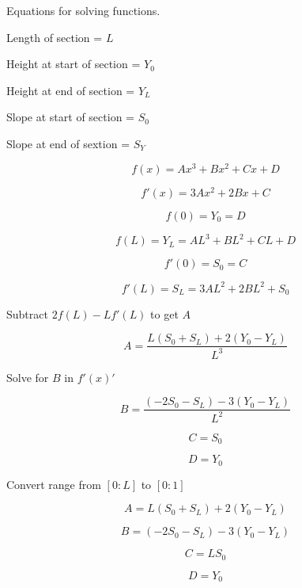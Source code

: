 \documentclass{article}
\begin{document}
Equations for solving functions.\\
\bigbreak

Length of section = $L$

Height at start of section = $Y_0$

Height at end of section = $Y_L$

Slope at start of section = $S_0$

Slope at end of sextion = $S_Y$


\begin{equation}
  f(x) = Ax^3 + Bx^2 + Cx + D
\end{equation}

\begin{equation}
  f'(x) = 3Ax^2 + 2Bx + C
\end{equation}

\begin{equation}
  f(0) = Y_0 = D
\end{equation}

\begin{equation}
  f(L) = Y_L = AL^3 + BL^2 + CL + D
\end{equation}

\begin{equation}
  f'(0) = S_0 = C
\end{equation}

\begin{equation}
  f'(L) = S_L = 3AL^2 + 2BL^2 + S_0
\end{equation}

\bigbreak
\bigbreak
Subtract $2f(L) - Lf'(L)$ to get $A$
\bigbreak
\bigbreak

\begin{equation}
  A = \frac{L(S_0 + S_L) + 2(Y_0 - Y_L)}{L^3}
\end{equation}

\bigbreak
\bigbreak
Solve for $B$ in $f'(x)'$
\bigbreak
\bigbreak

\begin{equation}
  B = \frac{(-2S_0 - S_L) - 3(Y_0 - Y_L)}{L^2}
\end{equation}

\begin{equation}
  C = S_0
\end{equation}

\begin{equation}
  D = Y_0
\end{equation}

\pagebreak

\bigbreak
\bigbreak
Convert range from $[0:L]$ to $[0:1]$
\bigbreak
\bigbreak

\begin{equation}
  A = L(S_0 + S_L) + 2(Y_0 - Y_L)
\end{equation}

\begin{equation}
  B = (-2S_0 - S_L) - 3(Y_0 - Y_L)
\end{equation}

\begin{equation}
  C = LS_0
\end{equation}

\begin{equation}
  D = Y_0
\end{equation}
\end{document}
